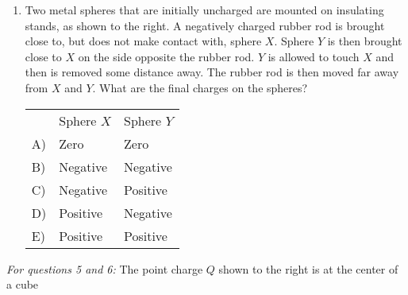 \documentclass[10pt]{article}
\begin{document}
\begin{enumerate}[itemsep=5mm]
  \item
    Two metal spheres that are initially uncharged are mounted on
    insulating stands, as shown to the right.  A negatively charged
    rubber rod is brought close to, but does not make contact with,
    sphere $X$.  Sphere $Y$ is then brought close to $X$ on the side
    opposite the rubber rod.  $Y$ is allowed to touch $X$ and then is
    removed some distance away.  The rubber rod is then moved far away
    from $X$ and $Y$.  What are the final charges on the spheres?
    \begin{table}[h]
      \hspace{1cm}
      \begin{tabular}{@{}lll@{}}
        \cmidrule(l){2-3}
           & Sphere $X$ & Sphere $Y$ \\ \cmidrule(l){2-3}
        A) & Zero       & Zero       \\
        B) & Negative   & Negative   \\
        C) & Negative   & Positive   \\
        D) & Positive   & Negative   \\
        E) & Positive   & Positive   \\ \cmidrule(l){2-3}
      \end{tabular}
    \end{table}
\end{enumerate}
{\it For questions 5 and 6:} The point charge $Q$ shown to the right
  is at the center of a cube
\end{document}
